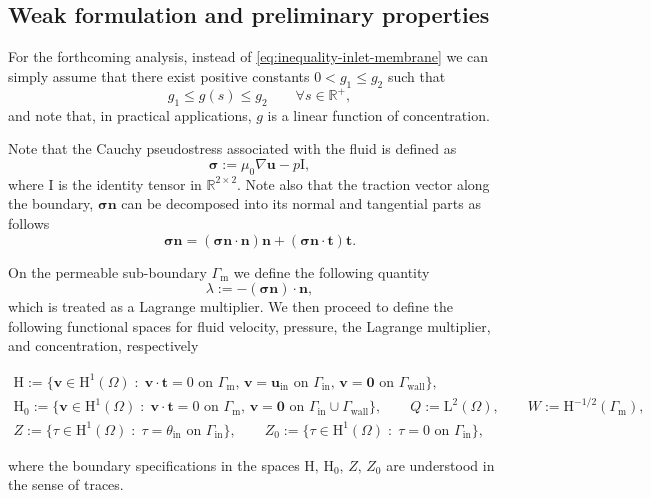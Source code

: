 \documentclass[onefignum,onetabnum,reqno,a4paper,final]{siamart250211}
\newcommand\bu{\boldsymbol{u}}
\newcommand\bv{\boldsymbol{v}}
\newcommand\bn{\boldsymbol{n}}
\newcommand\0{\mathbf{0}}
\newcommand{\bt}{\boldsymbol{t}}
\newcommand\bsig{\boldsymbol{\sigma}}
\renewcommand\H{\mathrm{H}}
\renewcommand\L{\mathrm{L}}
\newcommand\bH{\boldsymbol{\mathrm{H}}}
\newcommand\bI{\boldsymbol{\mathrm{I}}}
\newcommand\Gm{\Gamma_{\mathrm{m}}}
\newcommand\Gi{\Gamma_{\mathrm{in}}}
\newcommand\Gw{\Gamma_{\mathrm{wall}}}
\newcommand\buin{\boldsymbol{u}_{\mathrm{in}}}
\numberwithin{figure}{section}
\numberwithin{table}{section}
\begin{document}
	\subsection{Weak formulation and preliminary properties} \label{subsec:weak_formulation}
	For  the forthcoming analysis, instead of \eqref{eq:inequality-inlet-membrane} we can simply assume that there exist positive constants $0<g_1\leq g_2$ such that 
	\begin{equation}\label{eq:assumption-g}
		g_1 \leq g(s) \leq g_2 \qquad \forall s \in \mathbb{R}^+,\end{equation}
	and note that, in practical applications, $g$ is a linear function of concentration. 


Note that the Cauchy pseudostress associated with the fluid is defined as 
\[ \bsig := \mu_0\nabla\bu - p\bI,\]
where $\bI$ is the identity tensor in $\mathbb{R}^{2\times 2}$. Note also that the traction vector along the boundary, $\bsig\bn$ can be decomposed into its normal and tangential parts as follows 
\[ \bsig\bn = (\bsig\bn \cdot \bn)\bn + %
(\bsig\bn \cdot \boldsymbol{t})\boldsymbol{t}. \]

On the permeable sub-boundary $\Gm$ we define the following quantity 
\begin{equation}
	\label{eq:lagmult_lambda}
	\lambda:=-(\bsig\bn) \cdot \bn, 
\end{equation}
which is treated as a Lagrange multiplier. We then proceed to define the following functional spaces for fluid velocity, pressure, the Lagrange multiplier, and concentration,  respectively 
\begin{linenomath}
	\begin{gather*}
		\bH:=\{\bv\in \bH^1(\Omega)\;:\;\bv\cdot\bt = 0 \text{ on }\Gm,\,\bv=\buin\text{ on }\Gi,\,\bv=  \boldsymbol{0} \text{ on }\Gw\},\\  
		\bH_0:=\{\bv\in \bH^1(\Omega)\;:\;\bv\cdot\bt = 0 \text{ on }\Gm,\,\bv=\boldsymbol{0} \text{ on }\Gi\cup\Gw\},\qquad   Q:=\L^2(\Omega),\qquad 
		W:=\H^{-1/2}(\Gm), \\ 
		Z:=\{\tau\in \H^1(\Omega)\;:\;  \tau=\theta_{\mathrm{in}} \text{ on }\Gi \}, \qquad 
		Z_0:=\{\tau\in \H^1(\Omega)\;:\;  \tau=0 \text{ on }\Gi \},
	\end{gather*}
\end{linenomath}
where the boundary specifications in the spaces $\bH,\,\bH_0,\,Z,\,Z_0$ are understood in the sense of traces.
\end{document}
